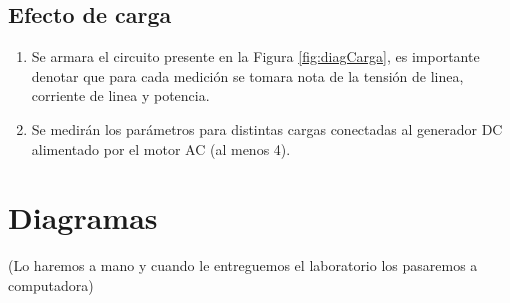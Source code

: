 \documentclass[11pt,letterpaper]{article}     %
\begin{document}
\subsection{Efecto de carga}
\begin{enumerate}
	\item Se armara el circuito presente en la Figura \ref{fig:diagCarga}, es importante denotar que para cada medición se tomara nota de la tensión  de linea, corriente de linea y potencia.
	\item Se medirán los parámetros para distintas cargas conectadas al generador DC alimentado por el motor AC (al menos 4).
\end{enumerate}
\section{Diagramas}
(Lo haremos a mano y cuando le entreguemos el laboratorio los pasaremos a computadora)
\end{document}
